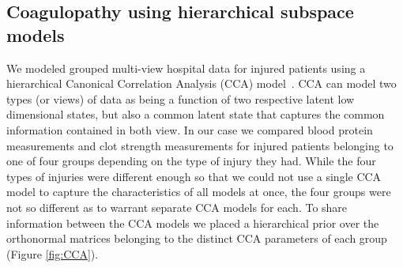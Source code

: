 \documentclass{article}
\begin{document}
\subsection{Coagulopathy using hierarchical subspace models}
We modeled grouped multi-view hospital data for injured patients using a hierarchical Canonical Correlation Analysis (CCA) model~\citep[chapt.~15.2]{murphy2012machine}. CCA can model two types (or views) of data as being a function of two respective latent low dimensional states, but also a common latent state that captures the common information contained in both view. In our case we compared blood protein measurements and clot strength measurements for injured patients belonging to one of four groups depending on the type of injury they had. While the four types of injuries were different enough so that we could not use a single CCA model to capture the characteristics of all models at once, the four groups were not so different as to warrant separate CCA models for each. To share information between the CCA models we placed a hierarchical prior over the orthonormal matrices belonging to the distinct CCA parameters of each group (Figure \ref{fig:CCA}).
\end{document}
